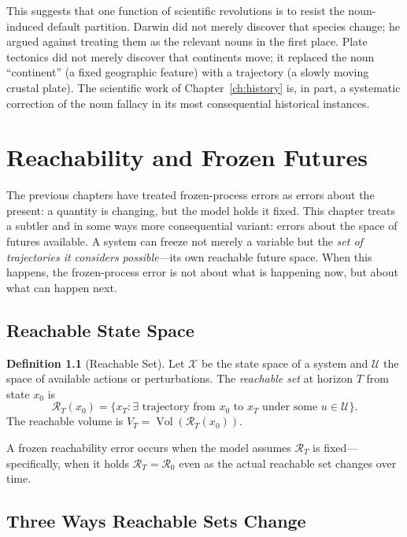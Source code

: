 \documentclass[11pt]{book}
\theoremstyle{plain}
\theoremstyle{definition}
\newtheorem{definition}[theorem]{Definition}
\theoremstyle{remark}
\begin{document}
This suggests that one function of scientific revolutions is to resist the noun-induced default partition. Darwin did not merely discover that species change; he argued against treating them as the relevant nouns in the first place. Plate tectonics did not merely discover that continents move; it replaced the noun ``continent'' (a fixed geographic feature) with a trajectory (a slowly moving crustal plate). The scientific work of Chapter~\ref{ch:history} is, in part, a systematic correction of the noun fallacy in its most consequential historical instances.

\chapter{Reachability and Frozen Futures}
\label{ch:reachability}

The previous chapters have treated frozen-process errors as errors about the present: a quantity is changing, but the model holds it fixed. This chapter treats a subtler and in some ways more consequential variant: errors about the space of futures available. A system can freeze not merely a variable but the \emph{set of trajectories it considers possible}---its own reachable future space. When this happens, the frozen-process error is not about what is happening now, but about what can happen next.

\section{Reachable State Space}

\begin{definition}[Reachable Set]
Let $\mathcal{X}$ be the state space of a system and $\mathcal{U}$ the space of available actions or perturbations. The \emph{reachable set} at horizon $T$ from state $x_0$ is
\[
\mathcal{R}_T(x_0) = \big\{x_T : \exists \text{ trajectory from } x_0 \text{ to } x_T \text{ under some } u \in \mathcal{U}\big\}.
\]
The reachable volume is $V_T = \operatorname{Vol}(\mathcal{R}_T(x_0))$.
\end{definition}

A frozen reachability error occurs when the model assumes $\mathcal{R}_T$ is fixed---specifically, when it holds $\mathcal{R}_T = \mathcal{R}_0$ even as the actual reachable set changes over time.

\section{Three Ways Reachable Sets Change}
\end{document}
